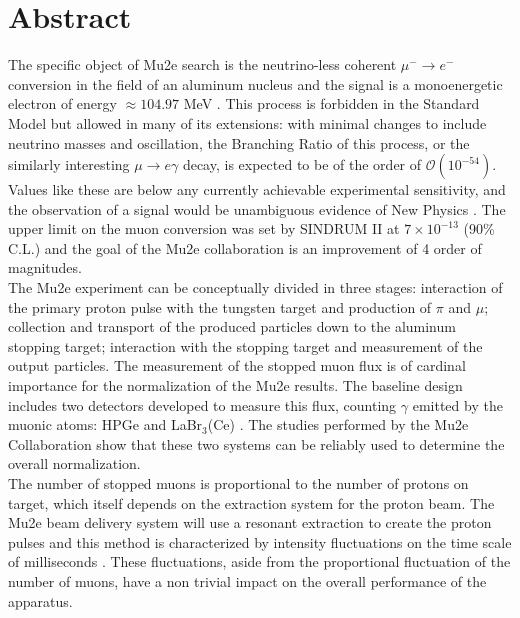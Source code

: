 \documentclass[12pt,a4paper,openright, oneside, titlepage]{book} %
\begin{document}
\chapter*{\centering Abstract}
\begin{changemargin}{1cm}{1cm}
The specific object of Mu2e search is  the neutrino-less coherent $\mu^-\rightarrow e^-$ conversion in the field of an aluminum nucleus and the signal is a monoenergetic electron of energy $ \approx 104.97$ MeV \cite{MTDR}.
This process is forbidden in the Standard Model but allowed in many of its extensions: with minimal changes to include neutrino masses and oscillation, the Branching Ratio of this process, or the similarly interesting $\mu\rightarrow e \gamma$ decay, is expected to be of the order of $\mathcal{O}(10^{-54})$.
Values like these are below any currently achievable experimental sensitivity, and the observation of a signal would be unambiguous evidence of New Physics \cite{Signorelli}.
The upper limit on the muon conversion was set by SINDRUM II at $7\times10^{-13}$ (90\% C.L.) \cite{SINDRUMII} and the goal of the Mu2e collaboration is an improvement of 4 order of magnitudes.\\
The Mu2e experiment can be conceptually divided in three stages: interaction of the primary proton pulse with the tungsten target and production of $\pi$ and $\mu$; collection and transport of the produced particles down to the aluminum stopping target; interaction with the stopping target and measurement of the output particles.
The measurement of the stopped muon flux is of cardinal importance for the normalization of the Mu2e results.
The baseline design includes two detectors developed to measure this flux, counting $\gamma$ emitted by the muonic atoms: HPGe and LaBr$_3$(Ce) \cite{STM:2016}\cite{LaBr3:2020}.
The studies performed by the Mu2e Collaboration show that these two systems can be reliably used to determine the overall normalization.\\
The number of stopped muons is proportional to the number of protons on target, which itself depends on the extraction system for the proton beam. 
The Mu2e beam delivery system will use a resonant extraction to create the proton pulses and this method is characterized by intensity fluctuations on the time scale of milliseconds \cite{SpillSim}. 
These fluctuations, aside from the proportional fluctuation of the number of muons, have a non trivial impact on the overall performance of the apparatus. 

\end{changemargin}
\end{document}
